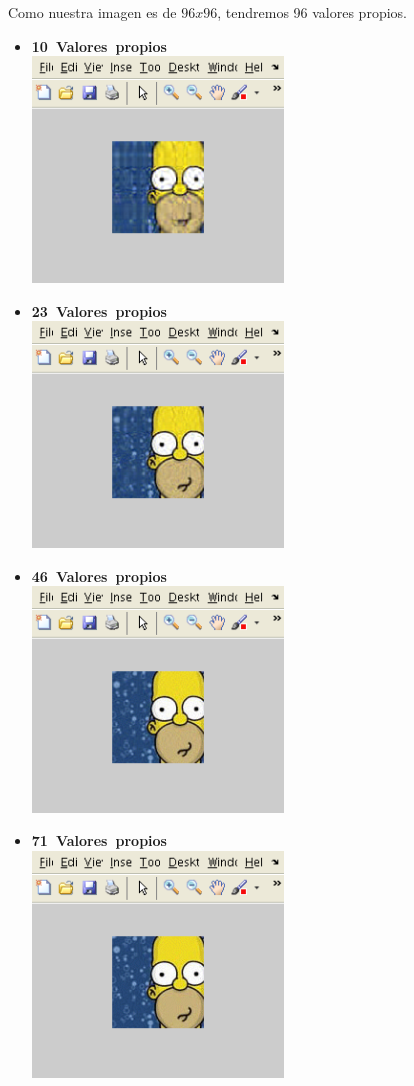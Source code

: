 Como nuestra imagen es de $96x96$, tendremos 96 valores propios.
	\begin{itemize}
		\item \textbf{10\ Valores\ propios}\\
			\includegraphics[height=6cm]{img/homero_10} 	
		\item \textbf{23\ Valores\ propios}\\
			\includegraphics[height=6cm]{img/homero_23} 	
		\item \textbf{46\ Valores\ propios}\\
			\includegraphics[height=6cm]{img/homero_46} 	
		\item \textbf{71\ Valores\ propios}\\
			\includegraphics[height=6cm]{img/homero_71} 	

\end{itemize}
